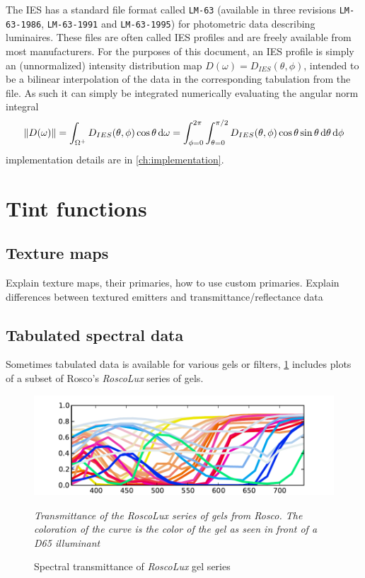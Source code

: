 The \gls{IES} has a standard file format called \texttt{LM-63} (available in
three revisions \texttt{LM-63-1986}, \texttt{LM-63-1991} and
\texttt{LM-63-1995}) for photometric data describing luminaires. These files
are often called \gls{IES} profiles and are freely available from most
manufacturers. For the purposes of this document, an \gls{IES} profile
is simply an (unnormalized) intensity distribution map $D(\omega) =
D_{IES}(\theta,\phi)$, intended to be a bilinear interpolation of the data in
the corresponding tabulation from the file. As such it can simply be integrated
numerically evaluating the angular norm integral
\begin{equation}
\|D(\omega)\|
   = \int_{\Omega^+}  D_{IES}(\theta,\phi) \cos\theta \d\omega
   = \int_{\phi = 0}^{2\pi} \int_{\theta = 0}^{\pi/2}
        D_{IES}(\theta,\phi) \cos\theta \sin\theta \d\theta \d\phi
\end{equation}
implementation details are in \cref{ch:implementation}.

\section{Tint functions}

\subsection{Texture maps}

\begin{inconstruction}
Explain texture maps, their primaries, how to use custom primaries.
Explain differences between textured emitters and transmittance/reflectance data
\end{inconstruction}

\subsection{Tabulated spectral data}
Sometimes tabulated data is available for various gels or filters, \cref{fig:roscolux}
includes plots of a subset of Rosco's \emph{RoscoLux} series of gels.

\begin{figure}
{
\centering
\includegraphics{figures/roscolux.pdf}
\caption{Spectral transmittance of \emph{RoscoLux} gel series}
\label{fig:roscolux}
}
\vskip 1mm
{\footnotesize\it Transmittance of the \emph{RoscoLux} series of gels from
Rosco. The coloration of the curve is the color of the gel as seen in front
of a D65 illuminant}
\end{figure}


